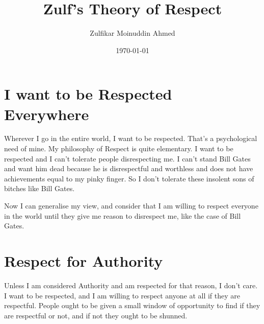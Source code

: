 \documentclass{amsart}
\title{Zulf's Theory of Respect}
\author{Zulfikar Moinuddin Ahmed}
\date{\today}
\begin{document}
\maketitle

\section{I want to be Respected Everywhere}

Wherever I go in the entire world, I want to be respected.  That's a psychological need of mine.  My philosophy of Respect is quite elementary.  I want to be respected and I can't tolerate people disrespecting me.  I can't stand Bill Gates and want him dead because he is disrespectful and worthless and does not have achievements equal to my pinky finger.  So I don't tolerate these insolent sons of bitches like Bill Gates.

Now I can generalise my view, and consider that I am willing to respect everyone in the world until they give me reason to disrespect me, like the case of Bill Gates.  

\section{Respect for Authority}

Unless I am considered Authority and am respected for that reason, I don't care.  I want to be respected, and I am willing to respect anyone at all if they are respectful.  People ought to be given a small window of opportunity to find if they are respectful or not, and if not they ought to be shunned.
\end{document}

